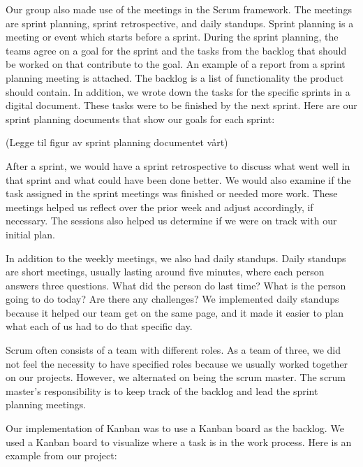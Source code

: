 Our group also made use of the meetings in the Scrum framework. The meetings are sprint planning, sprint retrospective, and daily standups. Sprint planning is a meeting or event which starts before a sprint. During the sprint planning, the teams agree on a goal for the sprint and the tasks from the backlog that should be worked on that contribute to the goal. An example of a report from a sprint planning meeting is attached. The backlog is a list of functionality the product should contain. In addition, we wrote down the tasks for the specific sprints in a digital document. These tasks were to be finished by the next sprint. Here are our sprint planning documents that show our goals for each sprint:

(Legge til figur av sprint planning documentet vårt)

After a sprint, we would have a sprint retrospective to discuss what went well in that sprint and what could have been done better. We would also examine if the task assigned in the sprint meetings was finished or needed more work. These meetings helped us reflect over the prior week and adjust accordingly, if necessary. The sessions also helped us determine if we were on track with our initial plan. 
 
In addition to the weekly meetings, we also had daily standups. Daily standups are short meetings, usually lasting around five minutes, where each person answers three questions. What did the person do last time? What is the person going to do today? Are there any challenges? We implemented daily standups because it helped our team get on the same page, and it made it easier to plan what each of us had to do that specific day.

Scrum often consists of a team with different roles. As a team of three, we did not feel the necessity to have specified roles because we usually worked together on our projects. However, we alternated on being the scrum master. The scrum master's responsibility is to keep track of the backlog and lead the sprint planning meetings.

Our implementation of Kanban was to use a Kanban board as the backlog. We used a Kanban board to visualize where a task is in the work process. Here is an example from our project:

